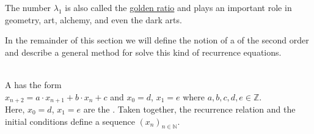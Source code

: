 \remark 
The number $\lambda_1$ is also called the \href{https://en.wikipedia.org/wiki/Golden_ratio}{golden ratio} 
and plays an important role in geometry, art, alchemy, and even the dark arts. \eox

In the remainder of this section we will define the notion of a 
of the second order and describe a general method for solve this kind of recurrence equations.

\begin{Definition} \hspace*{\fill} \\
  A 
  has the form
  \\[0.2cm]
  \hspace*{1.3cm}
  $x_{n+2} = a \cdot x_{n+1} + b \cdot x_n + c$ \quad and \quad $x_0 = d$, $x_1 = e$
  \quad where $a, b, c, d, e \in \mathbb{Z}$.
  \\[0.2cm]
  Here, $x_0 = d$, $x_1 = e$ are the .  Taken together, the recurrence
  relation and the initial conditions define a sequence $(x_n)_{n\in\mathbb{N}}$.  \eox
\end{Definition}

